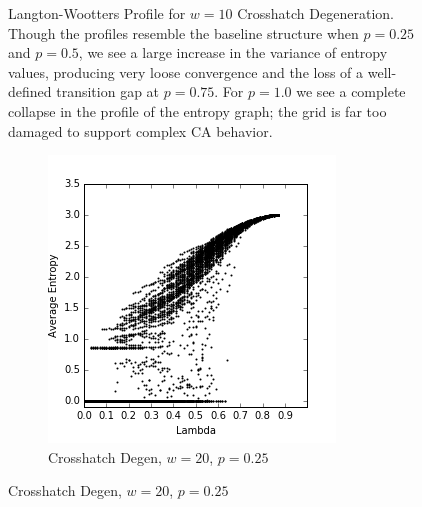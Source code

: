 \documentclass[a4paper,11pt,twoside]{report}
\begin{document}
\begin{figure}[htp]
\caption[Crosshatch Langton-Wootters Profile, $w=10$]{
  Langton-Wootters Profile for $w=10$ Crosshatch Degeneration. Though the profiles resemble the baseline structure when $p=0.25$ and $p=0.5$, we see a large increase in the variance of entropy values, producing very loose convergence and the loss of a well-defined transition gap at $p=0.75$. For $p=1.0$ we see a complete collapse in the profile of the entropy graph; the grid is far too damaged to support complex CA behavior.
}
\label{fig:lw_ch_10}
\end{figure}

\begin{figure}[htp]
\centering
\begin{subfigure}[t]{0.4\textwidth}
  \includegraphics[width=\textwidth]{ch6_figs/ch_w20_p25_entropy_scatter}
  \caption{Crosshatch Degen, $w=20$, $p=0.25$}


\end{subfigure}
\end{figure}
\end{document}
